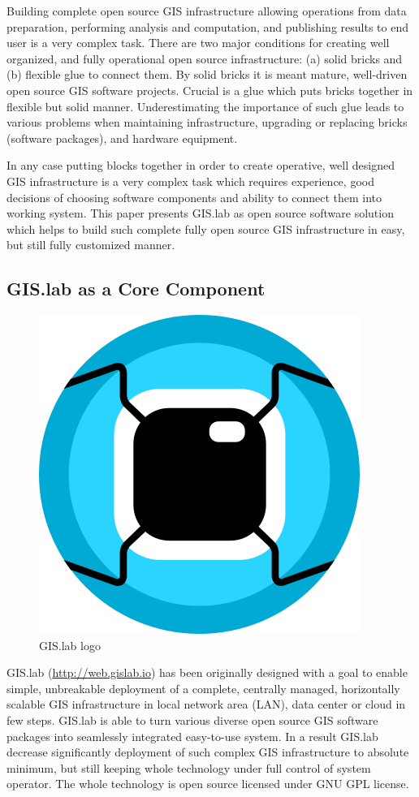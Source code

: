 \documentclass{isprs}
\begin{document}
Building complete open source GIS infrastructure allowing operations
from data preparation, performing analysis and computation, and
publishing results to end user is a very complex task. There are two
major conditions for creating well organized, and fully operational
open source infrastructure: (a) solid bricks and (b) flexible glue to
connect them. By solid bricks it is meant mature, well-driven open
source GIS software projects. Crucial is a glue which puts bricks
together in flexible but solid manner. Underestimating the importance
of such glue leads to various problems when maintaining
infrastructure, upgrading or replacing bricks (software packages), and
hardware equipment.

In any case putting blocks together in order to create operative, well
designed GIS infrastructure is a very complex task which requires
experience, good decisions of choosing software components and ability
to connect them into working system. This paper presents GIS.lab as
open source software solution which helps to build such complete fully
open source GIS infrastructure in easy, but still fully customized
manner.

\subsection{GIS.lab as a Core Component}

\begin{figure}[ht!]
\begin{center}
  \includegraphics[width=.25\columnwidth]{figures/gislab-logo.png}
  \caption{GIS.lab logo}
\label{fig:gislab_logo}
\end{center}
\end{figure}

GIS.lab (\url{http://web.gislab.io}) has been originally designed with
a goal to enable simple, unbreakable deployment of a complete,
centrally managed, horizontally scalable GIS infrastructure in local
network area (LAN), data center or cloud in few steps. GIS.lab is able
to turn various diverse open source GIS software packages into
seamlessly integrated easy-to-use system. In a result GIS.lab decrease
significantly deployment of such complex GIS infrastructure to
absolute minimum, but still keeping whole technology under full
control of system operator. The whole technology is open source
licensed under GNU GPL license.
\end{document}
